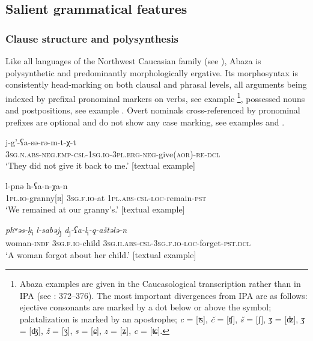 \documentclass[output=paper]{langscibook}
\begin{document}
\subsection{Salient grammatical features}\label{sec:Arkadiev:1.2}
 \subsubsection{Clause structure and polysynthesis}\label{sec:Arkadiev:1.2.1}

Like all languages of the Northwest Caucasian family (see \citealt{ArkadievLander2020}), Abaza is polysynthetic and predominantly morphologically ergative. Its morphosyntax is consistently head-marking on both clausal and phrasal levels, all arguments being indexed by prefixal pronominal markers on verbs, see example \footnote{Abaza examples are given in the Caucasological transcription rather than in IPA (see \citealt{ArkadievLander2020}: 372–376). The most important divergences from IPA are as follows: ejective consonants are marked by a dot below or above the symbol; palatalization is marked by an apostrophe; \textit{c} = [{ʦ}], \textit{č} = [{ʧ}], \textit{š} = [{ʃ}], \textit{{ʒ}} = [{ʣ}], \textit{{ʒ}} = [{ʤ}], \textit{ž} = [{ʒ}], \textit{s} = [{ɕ}], \textit{z} = [{ʑ}], \textit{c} = [{ʨ}].}, possessed nouns and postpositions, see example . Overt nominals cross-referenced by pronominal prefixes are optional and do not show any case marking, see examples  and .



\ea 
\label{ex:Arkadiev:1}
    \gll j-g’-{ʕ}a-s{ə}-r{ə}-m-t-χ-t \\
    \textsc{3sg.n.abs-neg.emp-csl-1sg.io-3pl.erg-neg}{}-give(\textsc{aor)-re-dcl}\\
    \glt ‘They did not give it back to me.’ [textual example]
\z
 



\ea 
\label{ex:Arkadiev:2}
      l-pn{ə}  h-{ʕ}a-n-χa-n\\
    \textsc{1pl.io}{}-granny[\textsc{r}] \textsc{3sg.f.io}{}-at \textsc{1pl.abs-csl}{}-\textsc{loc}{}-remain-\textsc{pst}\\
    \glt ‘We remained at our granny’s.’ [textual example]
\z

 
\ea 
\label{ex:Arkadiev:3}
    \gll \textit{ph{ʷ}{ǝ}s-{ḳ}}\textsubscript{i}  \textit{l-sab{ǝ}j}\textsubscript{j}  \textit{d}\textsubscript{j}\textit{{}-{ʕ}a-l}\textsubscript{i}\textit{{}-q-ašt{ǝ}l{ǝ}-n}\\
    woman-\textsc{indf}  \textsc{3sg.f.io}{}-child  \textsc{3sg.h.abs-csl-3sg.f.io-loc}{}-forget-\textsc{pst.dcl}\\
    \glt ‘A woman forgot about her child.’ [textual example]
\z
 
\end{document}
